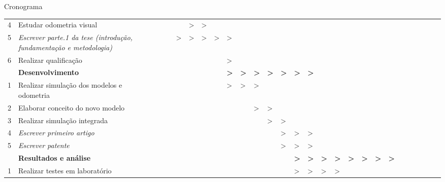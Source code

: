 \begin{frame}[c]{Cronograma}
\begin{table}[]
{\begin{tabular}{llll|llllllllllll|llllllllllll}
    4 & Estudar odometria visual &  &  &  &  & \textgreater{} & \textgreater{} &  &  &  &  &  &  &  &  &  &  &  &  &  &  &  &  &  &  &  &  \\
    5 & {\color[HTML]{3166FF} \textit{Escrever parte.1 da tese (introdução, fundamentação e metodologia)}} &  &  &  & \textgreater{} & \textgreater{} & \textgreater{} & \textgreater{} & \textgreater{} &  &  &  &  &  &  &  &  &  &  &  &  &  &  &  &  &  &  \\
    6 & {\color[HTML]{9A0000} Realizar qualificação} &  &  &  &  &  &  &  & \textgreater{} &  &  &  &  &  &  &  &  &  &  &  &  &  &  &  &  &  &  \\ \hline
     & \textbf{Desenvolvimento} &  &  &  &  &  &  &  & \textbf{\textgreater{}} & \textbf{\textgreater{}} & \textbf{\textgreater{}} & \textbf{\textgreater{}} & \textbf{\textgreater{}} & \textbf{\textgreater{}} & \textbf{\textgreater{}} &  &  &  &  &  &  &  &  &  &  &  &  \\ \hline
    1 & Realizar simulação dos modelos e odometria &  &  &  &  &  &  &  & \textgreater{} & \textgreater{} & \textgreater{} &  &  &  &  &  &  &  &  &  &  &  &  &  &  &  &  \\
    2 & Elaborar conceito do novo modelo &  &  &  &  &  &  &  &  &  & \textgreater{} & \textgreater{} &  &  &  &  &  &  &  &  &  &  &  &  &  &  &  \\
    3 & Realizar simulação integrada &  &  &  &  &  &  &  &  &  &  & \textgreater{} & \textgreater{} &  &  &  &  &  &  &  &  &  &  &  &  &  &  \\
    4 & {\color[HTML]{3166FF} \textit{Escrever primeiro artigo}} &  &  &  &  &  &  &  &  &  &  &  & \textgreater{} & \textgreater{} & \textgreater{} &  &  &  &  &  &  &  &  &  &  &  &  \\
    5 & {\color[HTML]{3166FF} \textit{Escrever patente}} &  &  &  &  &  &  &  &  &  &  &  & \textgreater{} & \textgreater{} & \textgreater{} &  &  &  &  &  &  &  &  &  &  &  &  \\ \hline
     & \textbf{Resultados e análise} &  &  &  &  &  &  &  &  &  &  &  &  & \textbf{\textgreater{}} & \textbf{\textgreater{}} & \textbf{\textgreater{}} & \textbf{\textgreater{}} & \textbf{\textgreater{}} & \textbf{\textgreater{}} & \textbf{\textgreater{}} & \textbf{\textgreater{}} &  &  &  &  &  &  \\ \hline
    1 & Realizar testes em laboratório &  &  &  &  &  &  &  &  &  &  &  &  & \textgreater{} & \textgreater{} & \textgreater{} & \textgreater{} &  &  &  &  &  &  &  &  &  &  \\

\end{tabular}}
\end{table}
\end{frame}
